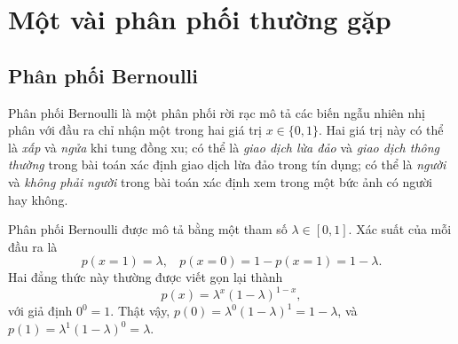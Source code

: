 

\section{Một vài phân phối thường gặp}
\subsection{Phân phối Bernoulli}

Phân phối Bernoulli là một phân phối rời rạc mô tả các biến ngẫu nhiên nhị
phân với đầu ra chỉ nhận một trong hai giá trị $x \in \{0, 1\}$. Hai giá trị
này có thể là \textit{xấp} và \textit{ngửa} khi tung đồng xu; có thể là
\textit{giao dịch lừa đảo} và \textit{giao dịch thông thường} trong bài toán
xác
định giao dịch lừa đảo trong tín dụng; có thể là \textit{người} và \textit{không
phải người} trong bài toán xác định xem trong một bức ảnh có người hay không.

Phân phối Bernoulli được mô tả bằng một tham số $\lambda \in [0, 1]$. Xác suất của mỗi đầu ra là
\begin{equation}
\label{eqn:30_29}
p(x = 1) = \lambda, ~~~~ p(x = 0) = 1 - p(x = 1) = 1 - \lambda.
\end{equation}
Hai đẳng thức này thường được viết gọn lại thành
\begin{equation}
\label{eqn:30_292}
p(x) = \lambda^x (1 - \lambda)^{1 - x},
\end{equation}
với giả định $0 ^0 = 1$. Thật vậy, $p(0) = \lambda^0 (1 - \lambda)^1 = 1 -
\lambda$, và $p(1) = \lambda^1 (1 - \lambda)^0 = \lambda$.


